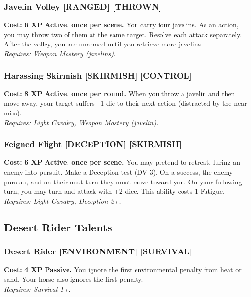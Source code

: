 \documentclass[12pt,a4paper]{book}
\begin{document}
\subsubsection*{Javelin Volley \textnormal{[RANGED] [THROWN]}}
\label{talent:javelin-volley}
\textbf{Cost: 6 XP} \textbf{Active, once per scene.} You carry four javelins. As an action, you may throw two of them at the same target. Resolve each attack separately. After the volley, you are unarmed until you retrieve more javelins. \\
\textit{Requires: Weapon Mastery (javelins).}

\subsubsection*{Harassing Skirmish \textnormal{[SKIRMISH] [CONTROL]}}
\label{talent:harassing-skirmish}
\textbf{Cost: 8 XP} \textbf{Active, once per round.} When you throw a javelin and then move away, your target suffers --1 die to their next action (distracted by the near miss). \\
\textit{Requires: Light Cavalry, Weapon Mastery (javelin).}

\subsubsection*{Feigned Flight \textnormal{[DECEPTION] [SKIRMISH]}}
\label{talent:feigned-flight}
\textbf{Cost: 6 XP} \textbf{Active, once per scene.} You may pretend to retreat, luring an enemy into pursuit. Make a Deception test (DV 3). On a success, the enemy pursues, and on their next turn they must move toward you. On your following turn, you may turn and attack with +2 dice. This ability costs 1 Fatigue. \\
\textit{Requires: Light Cavalry, Deception 2+.}

\subsection*{Desert Rider Talents}
\label{sec:major-desert}

\subsubsection*{Desert Rider \textnormal{[ENVIRONMENT] [SURVIVAL]}}
\label{talent:desert-rider}
\textbf{Cost: 4 XP} \textbf{Passive.} You ignore the first environmental penalty from heat or sand. Your horse also ignores the first penalty. \\
\textit{Requires: Survival 1+.}
\end{document}
